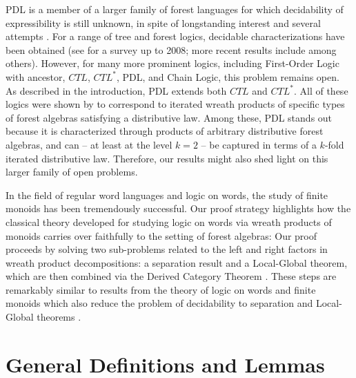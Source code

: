 \documentclass[sigplan,9pt]{acmart}\settopmatter{printfolios=true,printccs=false,printacmref=false}
\newcounter{theorem}
\theoremstyle{definition}
\begin{document}
PDL is a member of a larger family of forest languages for which decidability of expressibility is still unknown, in spite of longstanding interest and several attempts \cite{thomas-logical-1984,  potthoff-first-order-1995}. %
For a range of tree and forest logics, decidable characterizations have been obtained (see \cite{bojanczyk-effective-2008} for a survey up to 2008; more recent results include \cite{bojanczyk-piecewise-2012,bojanczyk-tree-2010,place-deciding-2010,place-decidable-2009,benedikt-regular-2009} among others).
However, for many more prominent logics, including First-Order Logic with ancestor, $CTL$, $CTL^*$, PDL, and Chain Logic, this problem remains open.
As described in the introduction, PDL extends both $CTL$ and $CTL^*$.
All of these logics were shown by \cite{bojanczyk-wreath-2012} to correspond to iterated wreath products of specific types of forest algebras satisfying a distributive law.
Among these, PDL stands out because it is characterized through products of arbitrary distributive forest algebras, and can -- at least at the level $k = 2$ -- be captured in terms of a $k$-fold iterated distributive law.
Therefore, our results might also shed light on this larger family of open problems.



In the field of regular word languages and logic on words, the study of finite monoids has been tremendously successful.
Our proof strategy highlights how the classical theory developed for studying logic on words via wreath products of monoids carries over faithfully to the setting of forest algebras:
Our proof proceeds by solving two sub-problems related to the left and right factors in wreath product decompositions: a separation result and a Local-Global theorem, which are then combined via the Derived Category Theorem \cite{tilson-categories-1987}.
These steps are remarkably similar to results from the theory of logic on words and finite monoids which also reduce the problem of decidability to separation \cite{place-going-2014} and Local-Global theorems \cite{krebs-effective-2012}.



%


\newpage

\appendix*
\section{General Definitions and Lemmas}
\end{document}
